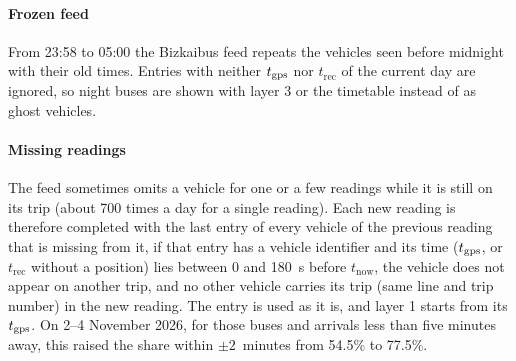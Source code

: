\paragraph{Frozen feed} From 23:58 to 05:00 the Bizkaibus feed repeats the vehicles seen before midnight with their
old times. Entries with neither $t_{\mathrm{gps}}$ nor $t_{\mathrm{rec}}$ of the current day are ignored, so night buses are shown
with layer 3 or the timetable instead of as ghost vehicles.

\paragraph{Missing readings} The feed sometimes omits a vehicle for one or a few readings while it is still on its trip
(about 700 times a day for a single reading). Each new reading is therefore completed with the last entry of every
vehicle of the previous reading that is missing from it, if that entry has a vehicle identifier and its time
($t_{\mathrm{gps}}$, or $t_{\mathrm{rec}}$ without a position) lies between 0 and 180~s before $t_{\mathrm{now}}$, the vehicle
does not appear on another trip, and no other vehicle carries its trip (same line and trip number) in the new reading.
The entry is used as it is, and layer 1 starts from its $t_{\mathrm{gps}}$. On 2--4 November 2026, for those buses and arrivals
less than five minutes away, this raised the share within $\pm2$~minutes from 54.5\% to 77.5\%.
